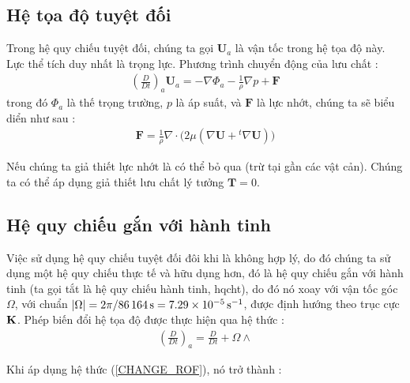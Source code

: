 \documentclass[DONG_HOC_KHI_QUYEN.tex]{subfiles}
\begin{document}
\subsection{Hệ tọa độ tuyệt đối}
Trong hệ quy chiếu tuyệt đối, chúng ta gọi $\textbf{U}_a$ là vận tốc trong hệ tọa độ này. Lực thể tích duy nhất là trọng lực. Phương trình chuyển động của lưu chất :
\begin{equation}
	\begin{aligned}
		{\left( {\frac{D}{{Dt}}} \right)_a}{\textbf{U}_a} =  - \nabla {\Phi _a} - \frac{1}{\rho }\nabla p + \textbf{F}
	\end{aligned}
\end{equation}
trong đó $\Phi_a$ là thế trọng trường, $p$ là áp suất, và $\textbf{F}$ là lực nhớt, chúng ta sẽ biểu diển như sau :
\begin{equation}
	\begin{aligned}
		\textbf{F} = \frac{1}{\rho }\nabla  \cdot \Big( {2\mu \left( {\nabla \textbf{U} + {}^t\nabla \textbf{U}} \right)} \Big)
	\end{aligned}
\end{equation}

Nếu chúng ta giả thiết lực nhớt là có thể bỏ qua (trừ tại gần các vật cản). Chúng ta có thể áp dụng giả thiết lưu chất lý tưởng $\textbf{T} = 0$.
\subsection{Hệ quy chiếu gắn với hành tinh}
Việc sử dụng hệ quy chiếu tuyệt đối đôi khi là không hợp lý, do đó chúng ta sử dụng một hệ quy chiếu thực tế và hữu dụng hơn, đó là hệ quy chiếu gắn với hành tinh (ta gọi tắt là hệ quy chiếu hành tinh, hqcht), do đó nó xoay với vận tốc góc $\Omega$, với chuẩn $\lvert{\Omega}\rvert=2\pi/\qty{86164}{\second} = \qty{7.29e-5}{\per\second}$, được định hướng theo trục cực $\bf K$. Phép biến đổi hệ tọa độ được thực hiện qua hệ thức :
\begin{equation}\label{CHANGE_ROF}
	\begin{aligned}
		{\left( {\frac{D}{{Dt}}} \right)_a} = \frac{D}{{Dt}} + \Omega  \wedge
	\end{aligned}
\end{equation}

Khi áp dụng hệ thức (\ref{CHANGE_ROF}), nó trở thành :
\end{document}
